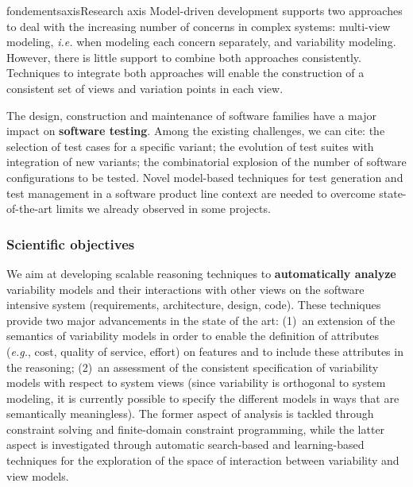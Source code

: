 \documentclass{ra2018}
\begin{document}
\begin{module}{fondements}{axis}{Research axis}
Model-driven development supports two approaches to deal with the increasing number of concerns in complex systems: multi-view modeling, \textit{i.e.} when modeling each concern separately, and variability modeling. However, there is little support to combine both approaches consistently. Techniques to integrate both approaches will enable the construction of a consistent set of views and variation points in each view.

The design, construction and maintenance of software families have a major impact on \textbf{software testing}. Among the existing challenges, we can cite: the selection of test cases for a specific variant; the evolution of test suites with integration of new variants; the combinatorial explosion of the number of software configurations to be tested. Novel model-based techniques for test generation and test management in a software product line context are needed to overcome state-of-the-art limits we already observed in some projects.

\subsubsection*{Scientific objectives} 


We aim at developing scalable reasoning techniques to \textbf{automatically analyze} variability models and their interactions with other views on the software intensive system (requirements, architecture, design, code). These techniques  provide two major advancements in the  state of the art: (1)~an extension of the semantics of variability models in order to enable the definition of attributes (\textit{e.g.}, cost, quality of service, effort) on features and to include these attributes in the reasoning;  (2)~an assessment of the consistent specification of variability models with respect to system views (since variability is orthogonal to system modeling, it is currently possible to specify the different models in ways that are semantically meaningless). The former aspect of analysis is tackled through  constraint solving and finite-domain constraint programming, while the latter aspect is investigated through automatic search-based and learning-based techniques for the exploration of the space of interaction between variability and view models.


\end{module}
\end{document}

